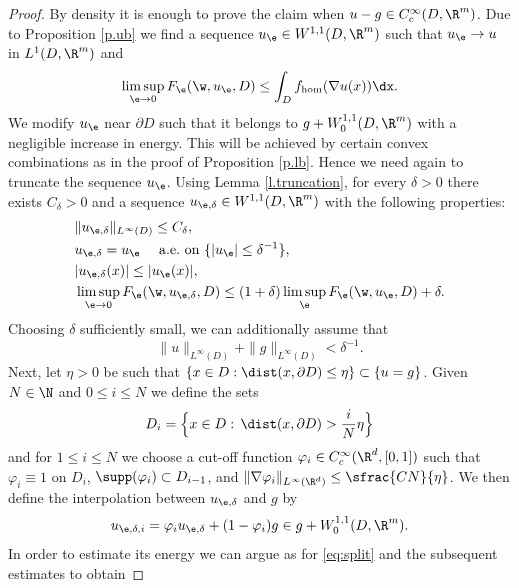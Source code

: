 \begin{proof}
By density it is enough to prove the claim when $u-g\in C_c^{\infty}(D,\R^m)$. Due to Proposition \ref{p.ub} we find a sequence $u_{\e}\in W^{1,1}(D,\R^m)$ such that $u_{\e}\to u$ in $L^1(D,\R^m)$ and
\begin{equation}\label{eq:recoverysequence}
\limsup_{\e\to 0}F_{\e}(\w,u_{\e},D)\leq \int_D f_{\hom}(\nabla u(x))\dx.
\end{equation}
We modify $u_{\e}$ near $\partial D$ such that it belongs to $ g+W_0^{1,1}(D,\R^m)$ with a negligible increase in energy. This will be achieved by certain convex combinations as in the proof of Proposition \ref{p.lb}. Hence we need again to truncate the sequence $u_{\e}$. Using Lemma \ref{l.truncation}, for every $\delta>0$ there exists $C_{\delta}>0$ and a sequence $u_{\e,\delta}\in W^{1,1}(D,\R^m)$ with the following properties:
\begin{align}
&\|u_{\e,\delta}\|_{L^{\infty}(D)}\leq C_{\delta},\label{eq:bound}
\\
&u_{\e,\delta}=u_{\e}\quad \text{ a.e.\ on }\{|u_{\e}|\leq \delta^{-1}\},\label{eq:equal}
\\
&|u_{\e,\delta}(x)|\leq |u_{\e}(x)|,\label{eq:smaller}
\\
&\limsup_{\e\to 0}F_{\e}(\w,u_{\e,\delta},D)\leq(1+\delta)\limsup_{\e}F_{\e}(\w,u_{\e},D)+\delta.\label{eq:energy}
\end{align}
Choosing $\delta$ sufficiently small, we can additionally assume that
\begin{equation}\label{eq:dominateg}
\|u\|_{L^{\infty}(D)}+\|g\|_{L^{\infty}(D)}< \delta^{-1}.
\end{equation}
Next, let $\eta>0$ be such that $\{x\in D:\dist(x,\partial D)\leq \eta\}\subset \{u=g\}$. Given $N\in\N$ and $0\leq i\leq N$ we define the sets
\begin{equation*}
D_i=\Bigl\{x\in D:\,\dist(x,\partial D)>\frac{i}{N}\eta\Bigr\}
\end{equation*}
and for $1\leq i\leq N$ we choose a cut-off function $\varphi_{i}\in C_c^{\infty}(\R^d,[0,1])$ such that $\varphi_i\equiv 1$ on $D_i$, $\supp (\varphi_i)\subset D_{i-1}$, and $\|\nabla\varphi_i\|_{L^{\infty}(\R^d)}\leq \sfrac{CN}{\eta}$. We then define the interpolation between $u_{\e,\delta}$ and $g$ by
\begin{equation}\label{eq:convexcombo}
u_{\e,\delta,i}=\varphi_i u_{\e,\delta}+(1-\varphi_i)g\in g+W_0^{1,1}(D,\R^m).
\end{equation}
In order to estimate its energy we can argue as for \eqref{eq:split} and the subsequent estimates to obtain

\end{proof}
